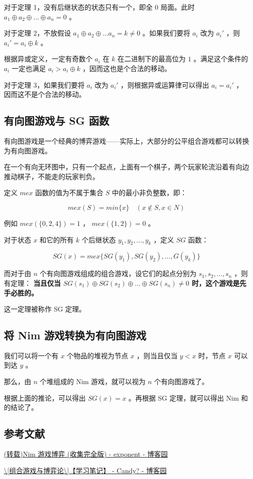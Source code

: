 对于定理 1，没有后继状态的状态只有一个，即全 $0$ 局面。此时 $a_1 \oplus a_2 \oplus \ldots \oplus a_n = 0$ 。

对于定理 2，不放假设 $a_1 \oplus a_2 \oplus \ldots a_n = k \neq 0$ 。如果我们要将 $a_i$ 改为 $a_i'$ ，则 $a_i'=a_i \oplus k$ 。

根据异或定义，一定有奇数个 $a_i$ 在 $k$ 在二进制下的最高位为 $1$ 。满足这个条件的 $a_i$ 一定也满足 $a_i > a_i \oplus k$ ，因而这也是个合法的移动。

对于定理 3，如果我们要将 $a_i$ 改为 $a_i'$ ，则根据异或运算律可以得出 $a_i=a_i'$ ，因而这不是个合法的移动。

\subsection{有向图游戏与 SG 函数}

有向图游戏是一个经典的博弈游戏——实际上，大部分的公平组合游戏都可以转换为有向图游戏。

在一个有向无环图中，只有一个起点，上面有一个棋子，两个玩家轮流沿着有向边推动棋子，不能走的玩家判负。

定义 $mex$ 函数的值为不属于集合 $S$ 中的最小非负整数，即：

$$
mex(S)=min\{x\} \quad (x \notin S, x \in N)
$$

例如 $mex(\{0, 2, 4\})=1$ ， $mex(\{1, 2\})=0$ 。

对于状态 $x$ 和它的所有 $k$ 个后继状态 $y_1, y_2, \ldots, y_k$ ，定义 $SG$ 函数：

$$
SG(x)=mex\{SG(y_1), SG(y_2), \ldots, G(y_k)\}
$$

而对于由 $n$ 个有向图游戏组成的组合游戏，设它们的起点分别为 $s_1, s_2, \ldots, s_n$ ，则有定理：\textbf{ 当且仅当 $SG(s_1) \oplus SG(s_2) \oplus \ldots \oplus SG(s_n) \neq 0$ 时，这个游戏是先手必胜的。}

这一定理被称作 SG 定理。

\subsection{将 Nim 游戏转换为有向图游戏}

我们可以将一个有 $x$ 个物品的堆视为节点 $x$ ，则当且仅当 $y<x$ 时，节点 $x$ 可以到达 $y$ 。

那么，由 $n$ 个堆组成的 Nim 游戏，就可以视为 $n$ 个有向图游戏了。

根据上面的推论，可以得出 $SG(x)=x$ 。再根据 SG 定理，就可以得出 Nim 和的结论了。

\subsection{参考文献}

\href{http://www.cnblogs.com/exponent/articles/2141477.html}{(转载)Nim 游戏博弈 (收集完全版) - exponent - 博客园}

\href{https://www.cnblogs.com/candy99/p/6548836.html}{\textbackslash{}[组合游戏与博弈论\textbackslash{}]【学习笔记】 - Candy? - 博客园}
